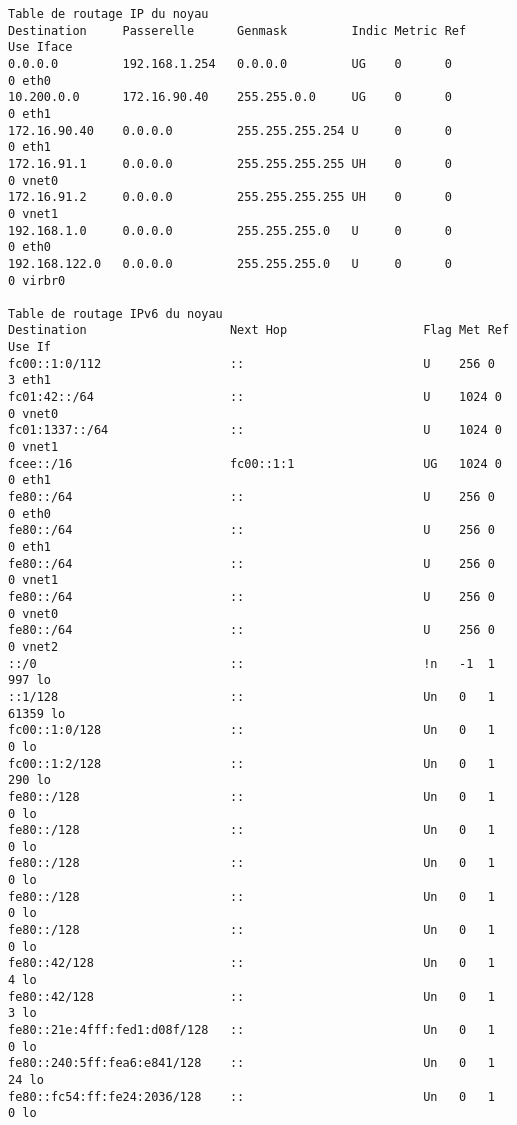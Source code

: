 \begin{verbatim}
Table de routage IP du noyau
Destination     Passerelle      Genmask         Indic Metric Ref    Use Iface
0.0.0.0         192.168.1.254   0.0.0.0         UG    0      0        0 eth0
10.200.0.0      172.16.90.40    255.255.0.0     UG    0      0        0 eth1
172.16.90.40    0.0.0.0         255.255.255.254 U     0      0        0 eth1
172.16.91.1     0.0.0.0         255.255.255.255 UH    0      0        0 vnet0
172.16.91.2     0.0.0.0         255.255.255.255 UH    0      0        0 vnet1
192.168.1.0     0.0.0.0         255.255.255.0   U     0      0        0 eth0
192.168.122.0   0.0.0.0         255.255.255.0   U     0      0        0 virbr0

Table de routage IPv6 du noyau
Destination                    Next Hop                   Flag Met Ref Use If
fc00::1:0/112                  ::                         U    256 0     3 eth1
fc01:42::/64                   ::                         U    1024 0     0 vnet0
fc01:1337::/64                 ::                         U    1024 0     0 vnet1
fcee::/16                      fc00::1:1                  UG   1024 0     0 eth1
fe80::/64                      ::                         U    256 0     0 eth0
fe80::/64                      ::                         U    256 0     0 eth1
fe80::/64                      ::                         U    256 0     0 vnet1
fe80::/64                      ::                         U    256 0     0 vnet0
fe80::/64                      ::                         U    256 0     0 vnet2
::/0                           ::                         !n   -1  1   997 lo
::1/128                        ::                         Un   0   1 61359 lo
fc00::1:0/128                  ::                         Un   0   1     0 lo
fc00::1:2/128                  ::                         Un   0   1   290 lo
fe80::/128                     ::                         Un   0   1     0 lo
fe80::/128                     ::                         Un   0   1     0 lo
fe80::/128                     ::                         Un   0   1     0 lo
fe80::/128                     ::                         Un   0   1     0 lo
fe80::/128                     ::                         Un   0   1     0 lo
fe80::42/128                   ::                         Un   0   1     4 lo
fe80::42/128                   ::                         Un   0   1     3 lo
fe80::21e:4fff:fed1:d08f/128   ::                         Un   0   1     0 lo
fe80::240:5ff:fea6:e841/128    ::                         Un   0   1    24 lo
fe80::fc54:ff:fe24:2036/128    ::                         Un   0   1     0 lo

\end{verbatim}
